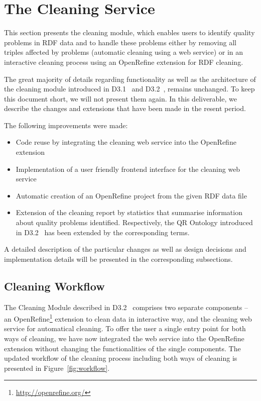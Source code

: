 \section{The Cleaning Service}
\label{sec:cleaning}

This section presents the cleaning module, which enables users to identify quality problems in RDF data and to handle these problems either by removing all triples affected by problems (automatic cleaning using a web service) or in an interactive cleaning process using an OpenRefine extension for RDF cleaning. 

The great majority of details regarding functionality as well as the architecture of the cleaning module introduced in D3.1~\cite{d3.1} and D3.2~\cite{d3.2}, remains unchanged.
To keep this document short, we will not present them again. 
In this deliverable, we describe the changes and extensions that have been made in the resent period. 

The following improvements were made:
\begin{itemize}
\item Code reuse by integrating the cleaning web service into the OpenRefine extension
\item Implementation of a user friendly frontend interface for the cleaning web service
\item Automatic creation of an OpenRefine project from the given RDF data file
\item Extension of the cleaning report by statistics that summarise information about quality problems identified. Respectively, the QR Ontology introduced in D3.2~\cite{d3.2} has been extended by the corresponding terms. 
\end{itemize}
A detailed description of the particular changes as well as design decisions and implementation details will be presented in the corresponding subsections.

\subsection{Cleaning Workflow}
The Cleaning Module described in D3.2~\cite{d3.2} comprises two separate components – an OpenRefine\footnote{\url{http://openrefine.org/}} extension to clean data in interactive way, and the cleaning web service for automatical cleaning.
To offer the user a single entry point for both ways of cleaning, we have now integrated the web service into the OpenRefine extension without changing the functionalities of the single components.
The updated workflow of the cleaning process including both ways of cleaning is presented in Figure~\ref{fig:workflow}.

